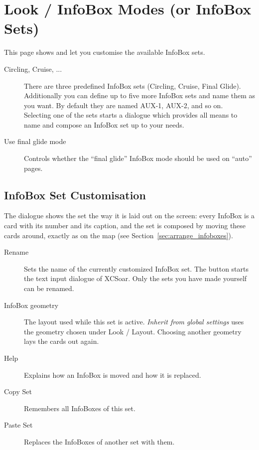 \section{Look / InfoBox Modes (or InfoBox Sets)}\label{sec:infobox_sets}
\label{conf:infobox_sets}

This page shows and let you customise the available InfoBox sets.

\begin{description}
\item[Circling, Cruise, ...]  There are three predefined InfoBox sets (Circling, Cruise, Final Glide). 
  Additionally you can define up to five more InfoBox sets and name them as you want.   
  By default they are named AUX-1, AUX-2, and so on. \\
  Selecting one of the sets starts a dialogue which provides all means to name and 
  compose an InfoBox set up to your needs.

\item[Use final glide mode]  Controls whether the ``final glide'' InfoBox mode should be used on ``auto'' pages.
\end{description}

\subsection*{InfoBox Set Customisation}

The dialogue shows the set the way it is laid out on the screen: every
InfoBox is a card with its number and its caption, and the set is
composed by moving these cards around, exactly as on the map (see
Section~\ref{sec:arrange_infoboxes}).

\begin{description}
\item[Rename]  Sets the name of the currently customized InfoBox set.
  The button starts the text input dialogue of XCSoar. Only the sets
  you have made yourself can be renamed.
\item[InfoBox geometry]  The layout used while this set is active.
  \emph{Inherit from global settings} uses the geometry chosen under
  Look / Layout.  Choosing another geometry lays the cards out again.
\item[Help]  Explains how an InfoBox is moved and how it is replaced.
\item[Copy Set]  Remembers all InfoBoxes of this set.
\item[Paste Set]  Replaces the InfoBoxes of another set with them.
\end{description}

